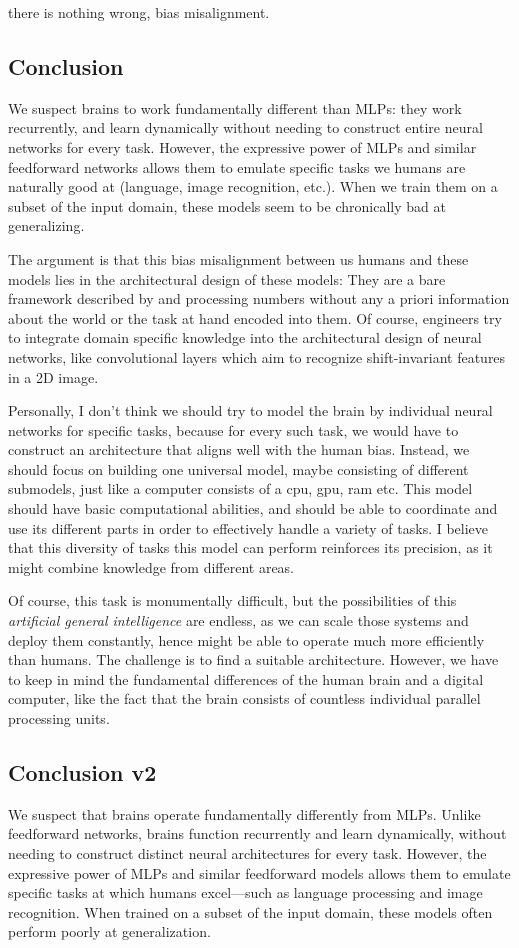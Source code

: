 \documentclass[../../main.tex]{subfiles}
\begin{document}
    there is nothing wrong, bias misalignment.

    \subsection{Conclusion}
    We suspect brains to work fundamentally different than MLPs: they work recurrently, and learn dynamically without needing to construct entire neural networks for every task. However, the expressive power of MLPs and similar feedforward networks allows them to emulate specific tasks we humans are naturally good at (language, image recognition, etc.). When we train them on a subset of the input domain, these models seem to be chronically bad at generalizing.
    
    The argument is that this bias misalignment between us humans and these models lies in the architectural design of these models: They are a bare framework described by and processing numbers without any a priori information about the world or the task at hand encoded into them. Of course, engineers try to integrate domain specific knowledge into the architectural design of neural networks, like convolutional layers which aim to recognize shift-invariant features in a 2D image.

    Personally, I don't think we should try to model the brain by individual neural networks for specific tasks, because for every such task, we would have to construct an architecture that aligns well with the human bias. Instead, we should focus on building one universal model, maybe consisting of different submodels, just like a computer consists of a cpu, gpu, ram etc. This model should have basic computational abilities, and should be able to coordinate and use its different parts in order to effectively handle a variety of tasks. I believe that this diversity of tasks this model can perform reinforces its precision, as it might combine knowledge from different areas.
    
    Of course, this task is monumentally difficult, but the possibilities of this \emph{artificial general intelligence} are endless, as we can scale those systems and deploy them constantly, hence might be able to operate much more efficiently than humans. The challenge is to find a suitable architecture. However, we have to keep in mind the fundamental differences of the human brain and a digital computer, like the fact that the brain consists of countless individual parallel processing units.

    \subsection{Conclusion v2}
    We suspect that brains operate fundamentally differently from MLPs. Unlike feedforward networks, brains function recurrently and learn dynamically, without needing to construct distinct neural architectures for every task. However, the expressive power of MLPs and similar feedforward models allows them to emulate specific tasks at which humans excel—such as language processing and image recognition. When trained on a subset of the input domain, these models often perform poorly at generalization.
\end{document}
